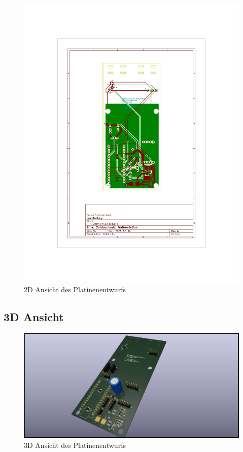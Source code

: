 \documentclass[a4paper,11pt]{article}
\begin{document}
\begin{figure}[H]
  \centering
  \includegraphics[scale=0.7, page=1]{PCBExtern.pdf}
  \caption{2D Ansicht des Platinenentwurfs}
  \label{pdf:platineExtern}
\end{figure}

\clearpage
\subsection{3D Ansicht}

\begin{figure}[H]
  \centering
  \includegraphics[width=\textwidth]{ExternalPCB3D.jpg}
  \caption{3D Ansicht des Platinenentwurfs}
  \label{fig:platineExtern3D}
\end{figure}
\end{document}

